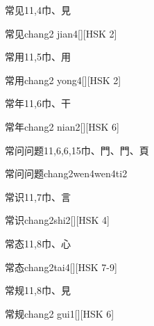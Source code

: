 \begin{Entry}{常见}{11,4}{⼱、⾒}
  \begin{Phonetics}{常见}{chang2 jian4}[][HSK 2]
  \end{Phonetics}
\end{Entry}

\begin{Entry}{常用}{11,5}{⼱、⽤}
  \begin{Phonetics}{常用}{chang2 yong4}[][HSK 2]
  \end{Phonetics}
\end{Entry}

\begin{Entry}{常年}{11,6}{⼱、⼲}
  \begin{Phonetics}{常年}{chang2 nian2}[][HSK 6]
  \end{Phonetics}
\end{Entry}

\begin{Entry}{常问问题}{11,6,6,15}{⼱、⾨、⾨、⾴}
  \begin{Phonetics}{常问问题}{chang2wen4wen4ti2}
  \end{Phonetics}
\end{Entry}

\begin{Entry}{常识}{11,7}{⼱、⾔}
  \begin{Phonetics}{常识}{chang2shi2}[][HSK 4]
  \end{Phonetics}
\end{Entry}

\begin{Entry}{常态}{11,8}{⼱、⼼}
  \begin{Phonetics}{常态}{chang2tai4}[][HSK 7-9]
  \end{Phonetics}
\end{Entry}

\begin{Entry}{常规}{11,8}{⼱、⾒}
  \begin{Phonetics}{常规}{chang2 gui1}[][HSK 6]
  \end{Phonetics}
\end{Entry}

